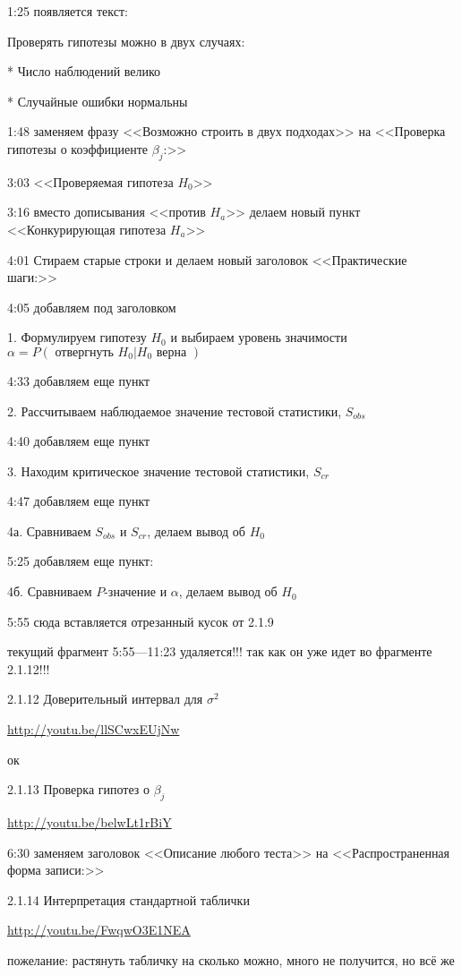 \documentclass[12pt,a4paper]{article}
\renewcommand{\P}{P}
\begin{document}
1:25 появляется текст:

Проверять гипотезы можно в двух случаях:

* Число наблюдений велико

* Случайные ошибки нормальны

1:48 заменяем фразу <<Возможно строить в двух подходах>> на <<Проверка гипотезы о коэффициенте $\beta_j$:>>

3:03 <<Проверяемая гипотеза $H_0$>>

3:16 вместо дописывания <<против $H_a$>> делаем новый пункт <<Конкурирующая гипотеза $H_a$>>

4:01 Стираем старые строки и делаем новый заголовок <<Практические шаги:>>

4:05 добавляем под заголовком

1. Формулируем гипотезу $H_0$ и выбираем уровень значимости $\alpha=\P( \text{ отвергнуть }H_0|H_0 \text{ верна })$

4:33 добавляем еще пункт

2. Рассчитываем наблюдаемое значение тестовой статистики, $S_{obs}$

4:40 добавляем еще пункт

3. Находим критическое значение тестовой статистики, $S_{cr}$

4:47 добавляем еще пункт

4а. Сравниваем $S_{obs}$ и $S_{cr}$, делаем вывод об $H_0$

5:25 добавляем еще пункт:

4б. Сравниваем $P$-значение и $\alpha$, делаем вывод об $H_0$

5:55 сюда вставляется отрезанный кусок от 2.1.9

текущий фрагмент 5:55---11:23 удаляется!!! так как он уже идет во фрагменте 2.1.12!!!


2.1.12 Доверительный интервал для $\sigma^2$

\url{http://youtu.be/llSCwxEUjNw}

ок

2.1.13 Проверка гипотез о $\beta_j$

\url{http://youtu.be/belwLt1rBiY}

6:30 заменяем заголовок <<Описание любого теста>> на <<Распространенная форма записи:>>


2.1.14 Интерпретация стандартной таблички 

\url{http://youtu.be/FwqwO3E1NEA}

пожелание: растянуть табличку на сколько можно, много не получится, но всё же
\end{document}
